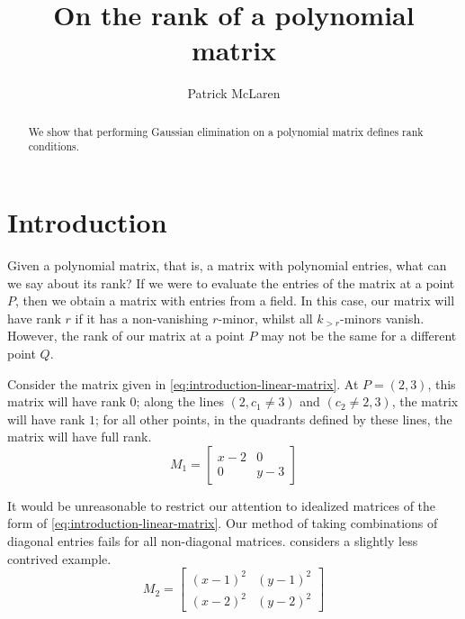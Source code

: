 \documentclass{amsart}
\theoremstyle{definition}
\theoremstyle{remark}
\numberwithin{equation}{section}
\begin{document}
\title{On the rank of a polynomial matrix}
\author{Patrick McLaren}

\begin{abstract}
  We show that performing Gaussian elimination on a polynomial matrix defines rank conditions.
\end{abstract}

\maketitle


\section{Introduction}

Given a polynomial matrix, that is, a matrix with polynomial entries, what can we say about its rank? If we were to evaluate the entries of the matrix at a point $P$, then we obtain a matrix with entries from a field. In this case, our matrix will have rank $r$ if it has a non-vanishing $r$-minor, whilst all $k_{> r}$-minors vanish. However, the rank of our matrix at a point $P$ may not be the same for a different point $Q$.

Consider the matrix given in \cref{eq:introduction-linear-matrix}. At $P = (2, 3)$, this matrix will have rank $0$; along the lines $(2, c_1 \not= 3)$ and $(c_2 \not= 2, 3)$, the matrix will have rank $1$;  for all other points, in the quadrants defined by these lines, the matrix will have full rank.
\begin{equation}
  \label{eq:introduction-linear-matrix}
  M_1 =
  \begin{bmatrix}
    x - 2 & 0\\
    0 & y - 3
  \end{bmatrix}
\end{equation}

It would be unreasonable to restrict our attention to idealized matrices of the form of \cref{eq:introduction-linear-matrix}. Our method of taking combinations of diagonal entries fails for all non-diagonal matrices.  considers a slightly less contrived example.
\begin{equation}
  \label{eq:introduction-quadratic-matrix}
  M_2 =
  \begin{bmatrix}
    (x - 1)^2 & (y - 1)^2\\
    (x - 2)^2 & (y - 2)^2
  \end{bmatrix}
\end{equation}
\end{document}
